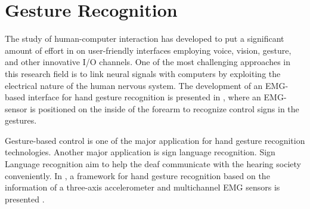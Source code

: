 \section{Gesture Recognition}
The study of human-computer interaction has developed to put a significant amount of effort in on user-friendly interfaces employing voice, vision, gesture, and other innovative I/O channels. One of the most challenging approaches in this research field is to link neural signals with computers by exploiting the electrical nature of the human nervous system. The development of an EMG-based interface for hand gesture recognition is presented in \cite{kim2008emg}, where an EMG-sensor is positioned on the inside of the forearm to recognize control signs in the gestures.

Gesture-based control is one of the major application for hand gesture recognition technologies. Another major application is sign language recognition. Sign Language recognition aim to help the deaf communicate with the hearing society conveniently. In \cite{zhang2011framework}, a framework for hand gesture recognition based on the information of a three-axis accelerometer and multichannel EMG sensors is presented .
